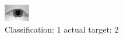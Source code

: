 \begin{figure}[h!]
\begin{center}
\includegraphics[width=0.60\columnwidth]{figures/ID879_class_1_target_2.png}
\end{center}
\caption{ Classification: 1 actual target: 2}
\label{fig:ID879_class_1_target_2}
\end{figure}
